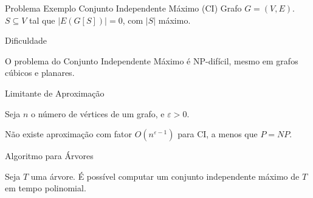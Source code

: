 \begin{frame}{Problema Exemplo}
        {Conjunto Independente Máximo (CI)}
        {Grafo $G = (V, E)$.\pause}
        {$S \subseteq V$ tal que $|E(G[S])|=0$, com $|S|$ máximo.}
\end{frame}

\begin{frame}{Dificuldade}
    \begin{thm}[\cite{Ga79}]
        O problema do Conjunto Independente Máximo é NP-difícil, mesmo em grafos cúbicos e planares.
    \end{thm}
\end{frame}

\begin{frame}{Limitante de Aproximação}
    \begin{thm}
        Seja $n$ o número de vértices de um grafo, e $\varepsilon > 0$. \medskip \pause

        Não existe aproximação com fator $O(n^{\varepsilon - 1})$ para CI, a menos que $P = NP$.
    \end{thm}
\end{frame}

\begin{frame}{Algoritmo para Árvores}
    \begin{thm}[folclore]
        Seja $T$ uma árvore. É possível computar um conjunto independente máximo de $T$ em tempo polinomial.
    \end{thm}
\end{frame}
